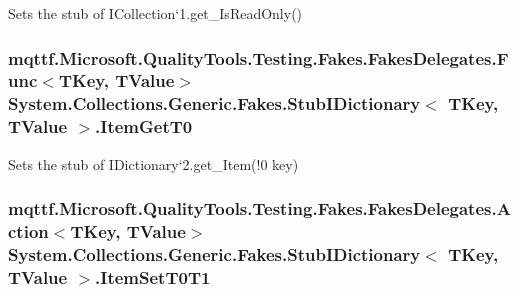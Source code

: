Sets the stub of I\-Collection`1.get\-\_\-\-Is\-Read\-Only()

\hypertarget{class_system_1_1_collections_1_1_generic_1_1_fakes_1_1_stub_i_dictionary_3_01_t_key_00_01_t_value_01_4_aa799f4d9a47df00de5da34360beed839}{
\subsubsection[{Item\-Get\-T0}]{\setlength{\rightskip}{0pt plus 5cm}mqttf.\-Microsoft.\-Quality\-Tools.\-Testing.\-Fakes.\-Fakes\-Delegates.\-Func$<$T\-Key, T\-Value$>$ System.\-Collections.\-Generic.\-Fakes.\-Stub\-I\-Dictionary$<$ T\-Key, T\-Value $>$.Item\-Get\-T0}}\label{class_system_1_1_collections_1_1_generic_1_1_fakes_1_1_stub_i_dictionary_3_01_t_key_00_01_t_value_01_4_aa799f4d9a47df00de5da34360beed839}


Sets the stub of I\-Dictionary`2.get\-\_\-\-Item(!0 key)

\hypertarget{class_system_1_1_collections_1_1_generic_1_1_fakes_1_1_stub_i_dictionary_3_01_t_key_00_01_t_value_01_4_a2271bb7b5e25bcc3b8e2731342e2a358}{
\subsubsection[{Item\-Set\-T0\-T1}]{\setlength{\rightskip}{0pt plus 5cm}mqttf.\-Microsoft.\-Quality\-Tools.\-Testing.\-Fakes.\-Fakes\-Delegates.\-Action$<$T\-Key, T\-Value$>$ System.\-Collections.\-Generic.\-Fakes.\-Stub\-I\-Dictionary$<$ T\-Key, T\-Value $>$.Item\-Set\-T0\-T1}}\label{class_system_1_1_collections_1_1_generic_1_1_fakes_1_1_stub_i_dictionary_3_01_t_key_00_01_t_value_01_4_a2271bb7b5e25bcc3b8e2731342e2a358}



